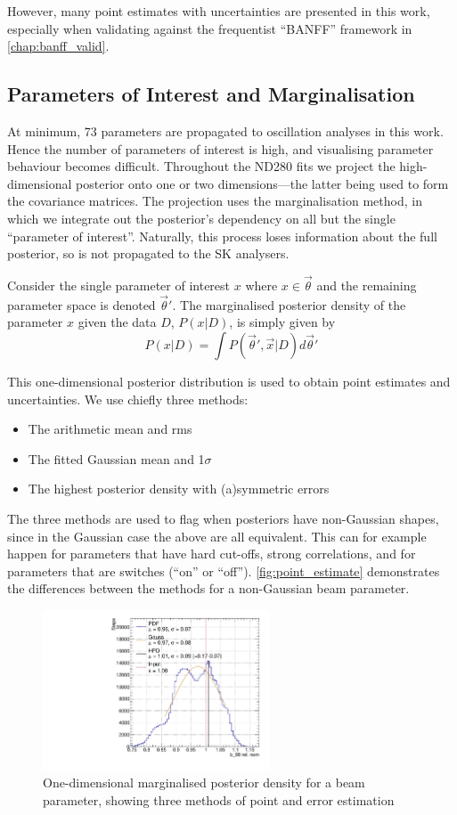 However, many point estimates with uncertainties are presented in this work, especially when validating against the frequentist ``BANFF'' framework in \autoref{chap:banff_valid}.
 
\subsection{Parameters of Interest and Marginalisation}
At minimum, 73 parameters are propagated to oscillation analyses in this work. Hence the number of parameters of interest is high, and visualising parameter behaviour becomes difficult. Throughout the ND280 fits we project the high-dimensional posterior onto one or two dimensions---the latter being used to form the covariance matrices. The projection uses the marginalisation method, in which we integrate out the posterior's dependency on all but the single ``parameter of interest''. Naturally, this process loses information about the full posterior, so is not propagated to the SK analysers.

Consider the single parameter of interest $x$ where $x \in \vec{\theta}$ and the remaining parameter space is denoted $\vec{\theta}'$. The marginalised posterior density of the parameter $x$ given the data $D$, $P(x|D)$, is simply given by
\begin{equation}
P(x|D) = \int P(\vec{\theta}',\vec{x}|D) d\vec{\theta}'
\end{equation}

This one-dimensional posterior distribution is used to obtain point estimates and uncertainties. We use chiefly three methods:
\begin{itemize}
	\item The arithmetic mean and rms
	\item The fitted Gaussian mean and 1$\sigma$
	\item The highest posterior density with (a)symmetric errors
\end{itemize}
The three methods are used to flag when posteriors have non-Gaussian shapes, since in the Gaussian case the above are all equivalent. This can for example happen for parameters that have hard cut-offs, strong correlations, and for parameters that are switches (``on'' or ``off''). \autoref{fig:point_estimate} demonstrates the differences between the methods for a non-Gaussian beam parameter.
\begin{figure}[h]
	\includegraphics[width=0.6\textwidth, trim={0mm 0mm 0mm 0mm}, clip,page=1]{figures/mcmc/b88_example}
	\caption{One-dimensional marginalised posterior density for a beam parameter, showing three methods of point and error estimation}
	\label{fig:point_estimate}
\end{figure}

